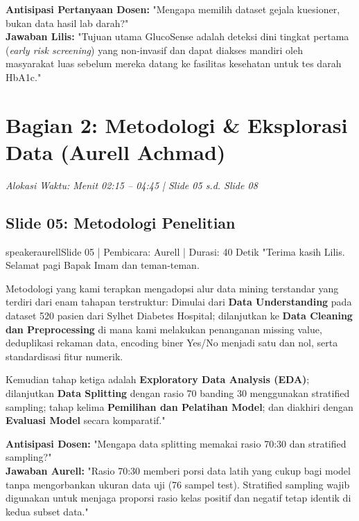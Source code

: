 \documentclass[11pt,a4paper]{article}
\begin{document}
\begin{defensebox}
\textbf{Antisipasi Pertanyaan Dosen:} "Mengapa memilih dataset gejala kuesioner, bukan data hasil lab darah?"\\
\textbf{Jawaban Lilis:} "Tujuan utama GlucoSense adalah deteksi dini tingkat pertama (\textit{early risk screening}) yang non-invasif dan dapat diakses mandiri oleh masyarakat luas sebelum mereka datang ke fasilitas kesehatan untuk tes darah HbA1c."
\end{defensebox}

\newpage

\section{Bagian 2: Metodologi \& Eksplorasi Data (Aurell Achmad)}
\textit{Alokasi Waktu: Menit 02:15 -- 04:45 | Slide 05 s.d. Slide 08}

\subsection{Slide 05: Metodologi Penelitian}
\begin{scriptbox}{speakeraurell}{Slide 05 | Pembicara: Aurell | Durasi: 40 Detik}
"Terima kasih Lilis. Selamat pagi Bapak Imam dan teman-teman.

Metodologi yang kami terapkan mengadopsi alur data mining terstandar yang terdiri dari enam tahapan terstruktur:
Dimulai dari \textbf{Data Understanding} pada dataset 520 pasien dari Sylhet Diabetes Hospital;
dilanjutkan ke \textbf{Data Cleaning dan Preprocessing} di mana kami melakukan penanganan missing value, deduplikasi rekaman data, encoding biner Yes/No menjadi satu dan nol, serta standardisasi fitur numerik.

Kemudian tahap ketiga adalah \textbf{Exploratory Data Analysis (EDA)}; dilanjutkan \textbf{Data Splitting} dengan rasio 70 banding 30 menggunakan stratified sampling; 
tahap kelima \textbf{Pemilihan dan Pelatihan Model}; dan diakhiri dengan \textbf{Evaluasi Model} secara komparatif."
\end{scriptbox}

\begin{defensebox}
\textbf{Antisipasi Dosen:} "Mengapa data splitting memakai rasio 70:30 dan stratified sampling?"\\
\textbf{Jawaban Aurell:} "Rasio 70:30 memberi porsi data latih yang cukup bagi model tanpa mengorbankan ukuran data uji (76 sampel test). Stratified sampling wajib digunakan untuk menjaga proporsi rasio kelas positif dan negatif tetap identik di kedua subset data."
\end{defensebox}
\end{document}
